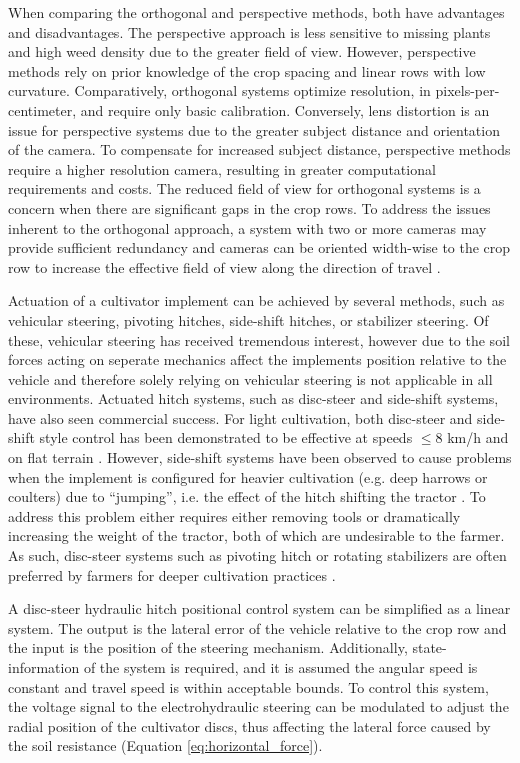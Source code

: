 \documentclass[authoryear]{elsarticle}
\begin{document}
When comparing the orthogonal and perspective methods, both have
advantages and disadvantages. The perspective approach is less
sensitive to missing plants and high weed density due to the greater
field of view. However, perspective methods rely on prior knowledge of
the crop spacing and linear rows with low curvature. Comparatively,
orthogonal systems optimize resolution, in pixels-per-centimeter, and
require only basic calibration. Conversely, lens distortion is an
issue for perspective systems due to the greater subject distance and
orientation of the camera. To compensate for increased subject
distance, perspective methods require a higher resolution camera,
resulting in greater computational requirements and costs. The reduced
field of view for orthogonal systems is a concern when there are
significant gaps in the crop rows. To address the issues inherent to
the orthogonal approach, a system with two or more cameras may provide
sufficient redundancy and cameras can be oriented width-wise to the
crop row to increase the effective field of view along the direction
of travel \citep{slaughter1995patent}.

Actuation of a cultivator implement can be achieved by several
methods, such as vehicular steering, pivoting hitches, side-shift
hitches, or stabilizer steering. Of these, vehicular steering has
received tremendous interest, however due to the soil forces acting on
seperate mechanics affect the implements position relative to the
vehicle and therefore solely relying on vehicular steering is not
applicable in all environments. Actuated hitch systems, such as
disc-steer and side-shift systems, have also seen commercial
success. For light cultivation, both disc-steer and side-shift style
control has been demonstrated to be effective at speeds $\le$8 km/h
and on flat terrain \citep{kocher2000}. However, side-shift systems
have been observed to cause problems when the implement is configured
for heavier cultivation (e.g. deep harrows or coulters) due to
“jumping”, i.e. the effect of the hitch shifting the tractor
. To address this problem either requires either
removing tools or dramatically increasing the weight of the tractor,
both of which are undesirable to the farmer. As such, disc-steer
systems such as pivoting hitch or rotating stabilizers are often
preferred by farmers for deeper cultivation practices \citep{desperrier2014}.

A disc-steer hydraulic hitch positional control system can be simplified as a
linear system. The output is the lateral error of the vehicle relative
to the crop row and the input is the position of the steering
mechanism. Additionally, state-information of the system is required,
and it is assumed the angular speed is constant and travel speed is
within acceptable bounds. To control this system, the voltage signal
to the electrohydraulic steering can be modulated to adjust the
radial position of the cultivator discs, thus affecting the lateral
force caused by the soil resistance (Equation \ref{eq:horizontal_force}).
\end{document}

